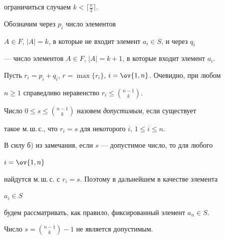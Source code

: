 ограничиться случаем $k<\lceil\frac{n}{2}\rceil$. 


Обозначим через $p_i$ число элементов 


$A\in F$, $|A|=k$, в которые не входит элемент $a_i\in S$, и через $q_i$ 


--- число элементов $A\in F$, $|A|=k+1$, в которые входит элемент $a_i$. 


 


Пусть $r_i=p_i+q_i$, $r=\max\{r_i\}$, $i=\ov{1,n}$. Очевидно, при любом 


$n\ge1$ справедливо неравенство $r_i\le\binom{n-1}{k}$. 


 


 


\begin{defn} 


Число $0\le s\le\binom{n-1}{k}$ назовем {\it допустимым}, если существует 


такое м.\,ш.\,с., что $r_i=s$ для некоторого $i$, $1\le i\le n$. 


\end{defn} 


 


В силу б) из замечания, если $s$ --- допустимое число, то для любого 


$i=\ov{1,n}$ 


найдутся м.\,ш.\,с. с $r_i=s$. Поэтому в дальнейшем в качестве элемента 


$a_i\in S$ 


будем рассматривать, как правило, фиксированный элемент $a_n\in S$. 


 


 


\begin{thm} 


Число $s=\binom{n-1}{k}-1$ не является допустимым. 


\end{thm} 


 


 



